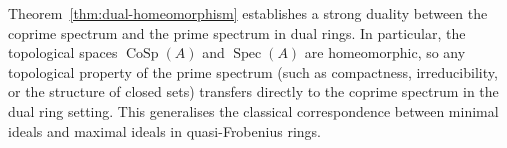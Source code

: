 \documentclass{amsart}
\begin{document}
Theorem~\ref{thm:dual-homeomorphism} establishes a strong duality between the coprime spectrum and the prime spectrum in dual rings. In particular, the topological spaces $\operatorname{CoSp}(A)$ and $\operatorname{Spec}(A)$ are homeomorphic, so any topological property of the prime spectrum (such as compactness, irreducibility, or the structure of closed sets) transfers directly to the coprime spectrum in the dual ring setting. This generalises the classical correspondence between minimal ideals and maximal ideals in quasi-Frobenius rings.




\end{document}
